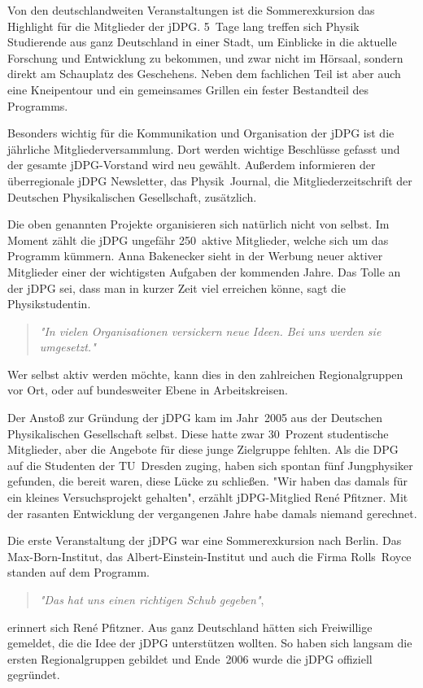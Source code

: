 \begin{multicols}{2}
Von den deutschlandweiten Veranstaltungen ist die Sommerexkursion das Highlight für die Mitglieder der jDPG.
5~Tage lang treffen sich Physik Studierende aus ganz Deutschland in einer Stadt, um Einblicke in die aktuelle Forschung und Entwicklung zu bekommen, und zwar nicht im Hörsaal, sondern direkt am Schauplatz des Geschehens.
Neben dem fachlichen Teil ist aber auch eine Kneipentour und ein gemeinsames Grillen ein fester Bestandteil des Programms.

Besonders wichtig für die Kommunikation und Organisation der jDPG ist die jährliche Mitgliederversammlung.
Dort werden wichtige Beschlüsse gefasst und der gesamte jDPG-Vorstand wird neu gewählt.
Außerdem informieren der überregionale jDPG Newsletter, das Physik~Journal, die Mitgliederzeitschrift der Deutschen Physikalischen Gesellschaft, zusätzlich.

Die oben genannten Projekte organisieren sich natürlich nicht von selbst.
Im Moment zählt die jDPG ungefähr 250~aktive Mitglieder, welche sich um das Programm kümmern.
Anna Bakenecker sieht in der Werbung neuer aktiver Mitglieder einer der wichtigsten Aufgaben der kommenden Jahre.
Das Tolle an der jDPG sei, dass man in kurzer Zeit viel erreichen könne, sagt die Physikstudentin.
\begin{quote}
    \textit{"In vielen Organisationen versickern neue Ideen.
    Bei uns werden sie umgesetzt."}
\end{quote}
Wer selbst aktiv werden möchte, kann dies in den zahlreichen Regionalgruppen vor Ort, oder auf bundesweiter Ebene in Arbeitskreisen.

Der Anstoß zur Gründung der jDPG kam im Jahr~2005 aus der Deutschen Physikalischen Gesellschaft selbst.
Diese hatte zwar 30~Prozent studentische Mitglieder, aber die Angebote für diese junge Zielgruppe fehlten.
Als die DPG auf die Studenten der TU~Dresden zuging, haben sich spontan fünf Jungphysiker gefunden, die bereit waren, diese Lücke zu schließen.
"Wir haben das damals für ein kleines Versuchsprojekt gehalten", erzählt jDPG-Mitglied René Pfitzner.
Mit der rasanten Entwicklung der vergangenen Jahre habe damals niemand gerechnet.

Die erste Veranstaltung der jDPG war eine Sommerexkursion nach Berlin.
Das Max-Born-Institut, das Albert-Einstein-Institut und auch die Firma Rolls~Royce standen auf dem Programm.

\begin{quote}
    \textit{"Das hat uns einen richtigen Schub gegeben"},
\end{quote}
erinnert sich René Pfitzner.
Aus ganz Deutschland hätten sich Freiwillige gemeldet, die die Idee der jDPG unterstützen wollten.
So haben sich langsam die ersten Regionalgruppen gebildet und Ende~2006 wurde die jDPG offiziell gegründet.


\end{multicols}

